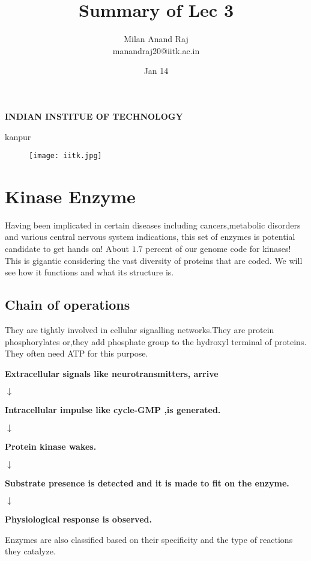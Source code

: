 \documentclass[12pt]{article}
\title{Summary of Lec 3}
\author{Milan Anand Raj\\manandraj20@iitk.ac.in}
\date{Jan 14}
\begin{document}
\NoBgThispage
\maketitle



\begin{center}
\textbf{INDIAN INSTITUE OF TECHNOLOGY}

kanpur
\end{center}


\vfill
\begin{figure}
\centering
\texttt{[image: iitk.jpg]}
\end{figure}
\clearpage
\tableofcontents
\clearpage
\NoBgThispage
\section{Kinase Enzyme}
Having been implicated in certain diseases including cancers,metabolic disorders and various central nervous system indications, this set of enzymes is potential candidate to get hands on!
About $1.7  $ percent of our genome code for kinases! This is gigantic considering the vast diversity of proteins that are coded.
We will see how it functions and what its structure is.



\subsection{Chain of operations }
They are tightly involved in cellular signalling networks.They are protein phosphorylates or,they add phosphate group to the hydroxyl terminal of proteins. They often need ATP for this purpose.
\begin{center}
\textbf{Extracellular signals like neurotransmitters, arrive }

$\downarrow$

\textbf{Intracellular impulse like cycle-GMP ,is generated.}

$\downarrow$

\textbf{Protein kinase wakes.}

$\downarrow$

\textbf{Substrate presence is detected and it is made to fit on the enzyme.}

$\downarrow$

\textbf{Physiological response is observed.}
\end{center}
Enzymes are also classified based on their specificity and the type of reactions they catalyze.
\end{document}
